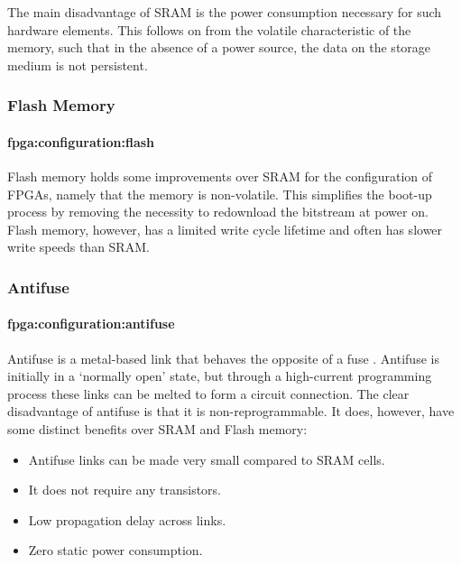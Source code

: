 The main disadvantage of \gls{SRAM} is the power consumption necessary for such
hardware elements. This follows on from the volatile characteristic of the
memory, such that in the absence of a power source, the data on the storage
medium is not persistent.

\subsubsection{Flash Memory}
\paragraph{fpga:configuration:flash}
Flash memory holds some improvements over \gls{SRAM} for the configuration of
\glspl{FPGA}, namely that the memory is non-volatile. This simplifies the
boot-up process by removing the necessity to redownload the bitstream at power
on. Flash memory, however, has a limited write cycle lifetime and often has
slower write speeds than \gls{SRAM}.

\subsubsection{Antifuse}
\paragraph{fpga:configuration:antifuse}
Antifuse is a metal-based link that behaves the opposite of a fuse
\cite{Hauck:2007}. Antifuse is initially in a `normally open' state, but through
a high-current programming process these links can be melted to form a circuit
connection. The clear disadvantage of antifuse is that it is non-reprogrammable.
It does, however, have some distinct benefits over \gls{SRAM} and Flash memory:
\begin{itemize}
    \item Antifuse links can be made very small compared to \gls{SRAM} cells.
    \item It does not require any transistors.
    \item Low propagation delay across links.
    \item Zero static power consumption.
\end{itemize}

